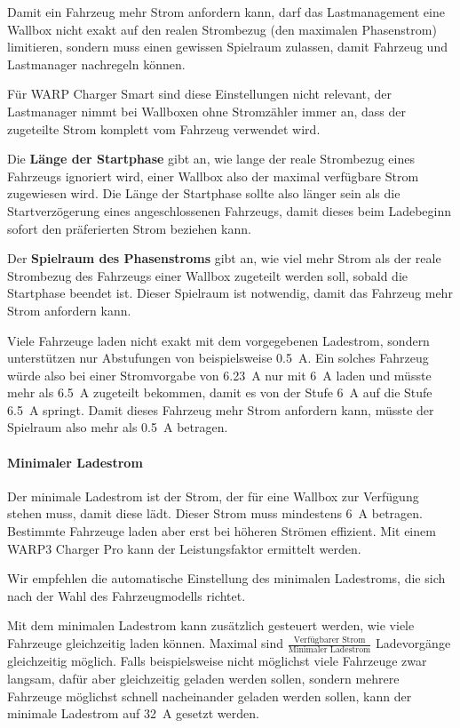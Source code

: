 \documentclass[a4paper,10pt]{article}
\newcommand{\hint}[1]{\begin{tcolorbox}[colback=boxgray,colframe=black,coltext=
white,title=Hinweis,left*=2mm,right*=2mm,boxsep=1mm,bottom=1mm,top=1mm]#1\end{tcolorbox}}
\begin{document}
\begin{multicols*}{2}
    Damit ein Fahrzeug mehr Strom anfordern kann, darf das Lastmanagement eine Wallbox nicht exakt
    auf den realen Strombezug (den maximalen Phasenstrom) limitieren, sondern muss einen gewissen Spielraum
    zulassen, damit Fahrzeug und Lastmanager nachregeln können.

    Für WARP Charger Smart sind diese Einstellungen nicht relevant,
    der Lastmanager nimmt bei Wallboxen ohne Stromzähler immer an, dass der zugeteilte Strom komplett vom Fahrzeug verwendet wird.

    Die \textbf{Länge der Startphase} gibt an, wie lange der reale Strombezug eines Fahrzeugs ignoriert wird,
    einer Wallbox also der maximal verfügbare Strom zugewiesen wird. Die Länge der Startphase sollte also
    länger sein als die Startverzögerung eines angeschlossenen Fahrzeugs, damit dieses beim Ladebeginn
    sofort den präferierten Strom beziehen kann.

    Der \textbf{Spielraum des Phasenstroms} gibt an, wie viel mehr Strom als der reale Strombezug des Fahrzeugs
    einer Wallbox zugeteilt werden soll, sobald die Startphase beendet ist. Dieser Spielraum ist notwendig, damit
    das Fahrzeug mehr Strom anfordern kann.

    Viele Fahrzeuge laden nicht exakt mit dem vorgegebenen Ladestrom, sondern unterstützen nur Abstufungen von beispielsweise \SI{0,5}{\ampere}.
    Ein solches Fahrzeug würde also bei einer Stromvorgabe von \SI{6,23}{\ampere} nur mit \SI{6}{\ampere} laden und müsste mehr als \SI{6,5}{\ampere} zugeteilt bekommen, damit es von der Stufe \SI{6}{\ampere} auf die Stufe \SI{6,5}{\ampere} springt.
    Damit dieses Fahrzeug mehr Strom anfordern kann, müsste der Spielraum also mehr als \SI{0,5}{\ampere} betragen.

    \paragraph{Minimaler Ladestrom}
    Der minimale Ladestrom ist der Strom, der für eine Wallbox zur Verfügung stehen muss, damit diese lädt. Dieser Strom muss mindestens \SI{6}{\ampere} betragen.
    Bestimmte Fahrzeuge laden aber erst bei höheren Strömen effizient. Mit einem
	WARP3 Charger Pro kann der Leistungsfaktor ermittelt werden.

    \hint{Wir empfehlen die automatische Einstellung des minimalen Ladestroms, die sich nach der Wahl des Fahrzeugmodells richtet.}

    Mit dem minimalen Ladestrom kann zusätzlich gesteuert werden, wie viele Fahrzeuge gleichzeitig laden können.
    Maximal sind $\frac{\text{Verfügbarer Strom}}{\text{Minimaler Ladestrom}}$ Ladevorgänge gleichzeitig möglich. Falls beispielsweise nicht möglichst viele
    Fahrzeuge zwar langsam, dafür aber gleichzeitig geladen werden sollen, sondern mehrere Fahrzeuge möglichst schnell nacheinander geladen werden sollen, kann der minimale Ladestrom auf \SI{32}{\ampere} gesetzt werden.


\end{multicols*}
\end{document}
